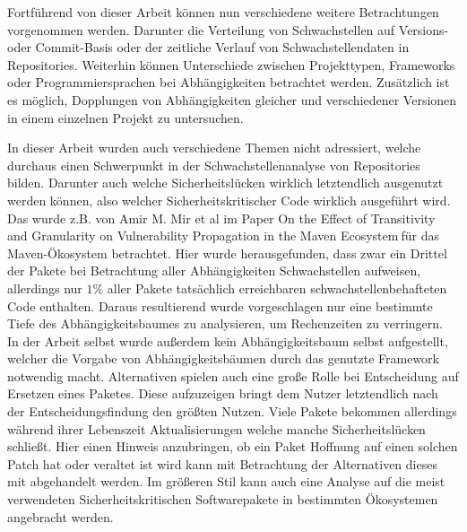     Fortführend von dieser Arbeit können nun verschiedene weitere Betrachtungen vorgenommen werden.
    Darunter die Verteilung von Schwachstellen auf Versions- oder Commit-Basis oder der zeitliche Verlauf von Schwachstellendaten in Repositories.
    Weiterhin können Unterschiede zwischen Projekttypen, Frameworks oder Programmiersprachen bei Abhängigkeiten betrachtet werden.
    Zusätzlich ist es möglich, Dopplungen von Abhängigkeiten gleicher und verschiedener Versionen in einem einzelnen Projekt zu untersuchen.

    In dieser Arbeit wurden auch verschiedene Themen nicht adressiert, welche durchaus einen Schwerpunkt in der Schwachstellenanalyse von Repositories bilden.
    Darunter auch welche Sicherheitslücken wirklich letztendlich ausgenutzt werden können, also welcher Sicherheitskritischer Code wirklich ausgeführt wird.
    Das wurde z.B. von Amir M. Mir et al im Paper \glqq On the Effect of Transitivity and Granularity on Vulnerability Propagation in the Maven Ecosystem\grqq$~$für das Maven-Ökosystem betrachtet.
    Hier wurde herausgefunden, dass zwar ein Drittel der Pakete bei Betrachtung aller Abhängigkeiten Schwachstellen aufweisen, allerdings nur $1\%$ aller Pakete tatsächlich erreichbaren schwachstellenbehafteten Code enthalten.
    Daraus resultierend wurde vorgeschlagen nur eine bestimmte Tiefe des Abhängigkeitsbaumes zu analysieren, um Rechenzeiten zu verringern.
    \\
    In der Arbeit selbst wurde außerdem kein Abhängigkeitsbaum selbst aufgestellt, welcher die Vorgabe von Abhängigkeitsbäumen durch das genutzte Framework notwendig macht.
    Alternativen spielen auch eine große Rolle bei Entscheidung auf Ersetzen eines Paketes.
    Diese aufzuzeigen bringt dem Nutzer letztendlich nach der Entscheidungsfindung den größten Nutzen.
    Viele Pakete bekommen allerdings während ihrer Lebenszeit Aktualisierungen welche manche Sicherheitslücken schließt.
    Hier einen Hinweis anzubringen, ob ein Paket Hoffnung auf einen solchen Patch hat oder veraltet ist wird kann mit Betrachtung der Alternativen dieses mit abgehandelt werden.
    Im größeren Stil kann auch eine Analyse auf die meist verwendeten Sicherheitskritischen Softwarepakete in bestimmten Ökosystemen angebracht werden. 

